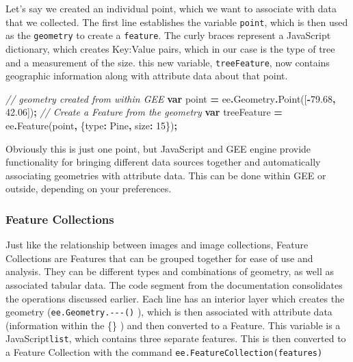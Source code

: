 \documentclass[
]{article}
\newenvironment{Shaded}{\begin{snugshade}}{\end{snugshade}}
\newcommand{\AttributeTok}[1]{\textcolor[rgb]{0.77,0.63,0.00}{#1}}
\newcommand{\CommentTok}[1]{\textcolor[rgb]{0.56,0.35,0.01}{\textit{#1}}}
\newcommand{\DataTypeTok}[1]{\textcolor[rgb]{0.13,0.29,0.53}{#1}}
\newcommand{\DecValTok}[1]{\textcolor[rgb]{0.00,0.00,0.81}{#1}}
\newcommand{\FloatTok}[1]{\textcolor[rgb]{0.00,0.00,0.81}{#1}}
\newcommand{\FunctionTok}[1]{\textcolor[rgb]{0.00,0.00,0.00}{#1}}
\newcommand{\KeywordTok}[1]{\textcolor[rgb]{0.13,0.29,0.53}{\textbf{#1}}}
\newcommand{\NormalTok}[1]{#1}
\newcommand{\OperatorTok}[1]{\textcolor[rgb]{0.81,0.36,0.00}{\textbf{#1}}}
\newcommand{\StringTok}[1]{\textcolor[rgb]{0.31,0.60,0.02}{#1}}
\begin{document}
Let's say we created an individual point, which we want to associate with data that we collected. The first line establishes the variable \texttt{point}, which is then used as the \texttt{geometry} to create a \texttt{feature}. The curly braces represent a JavaScript dictionary, which creates Key:Value pairs, which in our case is the type of tree and a measurement of the size. this new variable, \texttt{treeFeature}, now contains geographic information along with attribute data about that point.

\begin{Shaded}
\begin{Highlighting}[]
\CommentTok{// geometry created from within GEE}
\KeywordTok{var}\NormalTok{ point }\OperatorTok{=}\NormalTok{ ee}\OperatorTok{.}\AttributeTok{Geometry}\OperatorTok{.}\FunctionTok{Point}\NormalTok{([}\OperatorTok{{-}}\FloatTok{79.68}\OperatorTok{,} \FloatTok{42.06}\NormalTok{])}\OperatorTok{;}
\CommentTok{// Create a Feature from the geometry}
\KeywordTok{var}\NormalTok{ treeFeature }\OperatorTok{=}\NormalTok{ ee}\OperatorTok{.}\FunctionTok{Feature}\NormalTok{(point}\OperatorTok{,}\NormalTok{ \{}\DataTypeTok{type}\OperatorTok{:} \StringTok{\textquotesingle{}Pine\textquotesingle{}}\OperatorTok{,} \DataTypeTok{size}\OperatorTok{:} \DecValTok{15}\NormalTok{\})}\OperatorTok{;}
\end{Highlighting}
\end{Shaded}

Obviously this is just one point, but JavaScript and GEE engine provide functionality for bringing different data sources together and automatically associating geometries with attribute data. This can be done within GEE or outside, depending on your preferences.

\hypertarget{feature-collections}{%
\subsubsection{Feature Collections}\label{feature-collections}}

Just like the relationship between images and image collections, Feature Collections are Features that can be grouped together for ease of use and analysis. They can be different types and combinations of geometry, as well as associated tabular data. The code segment from the documentation consolidates the operations discussed earlier. Each line has an interior layer which creates the geometry (\texttt{ee.Geometry.-\/-\/-()} ), which is then associated with attribute data (information within the \{\} ) and then converted to a Feature. This variable is a JavaScript\texttt{list}, which contains three separate features. This is then converted to a Feature Collection with the command \texttt{ee.FeatureCollection(features)}
\end{document}
